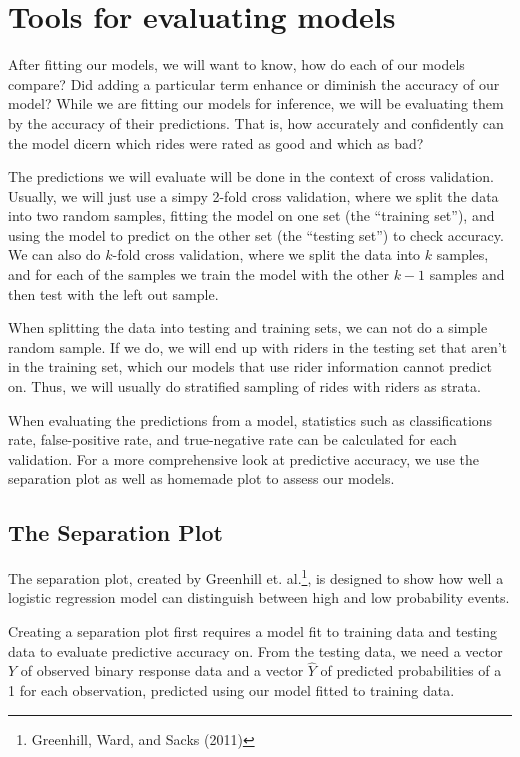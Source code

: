\documentclass[12pt,twoside]{reedthesis}
\begin{document}
  \section{Tools for evaluating models}\label{evaluate}
  
  After fitting our models, we will want to know, how do each of our
  models compare? Did adding a particular term enhance or diminish the
  accuracy of our model? While we are fitting our models for inference, we
  will be evaluating them by the accuracy of their predictions. That is,
  how accurately and confidently can the model dicern which rides were
  rated as good and which as bad?
  
  The predictions we will evaluate will be done in the context of cross
  validation. Usually, we will just use a simpy 2-fold cross validation,
  where we split the data into two random samples, fitting the model on
  one set (the ``training set''), and using the model to predict on the
  other set (the ``testing set'') to check accuracy. We can also do
  \(k\)-fold cross validation, where we split the data into \(k\) samples,
  and for each of the samples we train the model with the other \(k-1\)
  samples and then test with the left out sample.
  
  When splitting the data into testing and training sets, we can not do a
  simple random sample. If we do, we will end up with riders in the
  testing set that aren't in the training set, which our models that use
  rider information cannot predict on. Thus, we will usually do stratified
  sampling of rides with riders as strata.
  
  When evaluating the predictions from a model, statistics such as
  classifications rate, false-positive rate, and true-negative rate can be
  calculated for each validation. For a more comprehensive look at
  predictive accuracy, we use the separation plot as well as homemade plot
  to assess our models.
  
  \subsection{The Separation Plot}\label{the-separation-plot}
  
  The separation plot, created by Greenhill et. al.\footnote{Greenhill,
    Ward, and Sacks (2011)}, is designed to show how well a logistic
  regression model can distinguish between high and low probability
  events.
  
  Creating a separation plot first requires a model fit to training data
  and testing data to evaluate predictive accuracy on. From the testing
  data, we need a vector \(Y\) of observed binary response data and a
  vector \(\hat{Y}\) of predicted probabilities of a 1 for each
  observation, predicted using our model fitted to training data.
  
\end{document}
